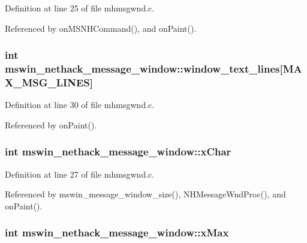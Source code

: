 Definition at line 25 of file mhmsgwnd.\+c.



Referenced by on\+M\+S\+N\+H\+Command(), and on\+Paint().

\hypertarget{structmswin__nethack__message__window_afa2db7ba637e5708d489acbddc9e989d}{
\subsubsection[{window\+\_\+text\+\_\+lines}]{\setlength{\rightskip}{0pt plus 5cm}int mswin\+\_\+nethack\+\_\+message\+\_\+window\+::window\+\_\+text\+\_\+lines\mbox{[}{\bf M\+A\+X\+\_\+\+M\+S\+G\+\_\+\+L\+I\+N\+E\+S}\mbox{]}}}\label{structmswin__nethack__message__window_afa2db7ba637e5708d489acbddc9e989d}


Definition at line 30 of file mhmsgwnd.\+c.



Referenced by on\+Paint().

\hypertarget{structmswin__nethack__message__window_a3a2ddfa2880d9e42fe99c727c9f52a6f}{
\subsubsection[{x\+Char}]{\setlength{\rightskip}{0pt plus 5cm}int mswin\+\_\+nethack\+\_\+message\+\_\+window\+::x\+Char}}\label{structmswin__nethack__message__window_a3a2ddfa2880d9e42fe99c727c9f52a6f}


Definition at line 27 of file mhmsgwnd.\+c.



Referenced by mswin\+\_\+message\+\_\+window\+\_\+size(), N\+H\+Message\+Wnd\+Proc(), and on\+Paint().

\hypertarget{structmswin__nethack__message__window_a4a4612686946a3904c34c050753583cb}{
\subsubsection[{x\+Max}]{\setlength{\rightskip}{0pt plus 5cm}int mswin\+\_\+nethack\+\_\+message\+\_\+window\+::x\+Max}}\label{structmswin__nethack__message__window_a4a4612686946a3904c34c050753583cb}


